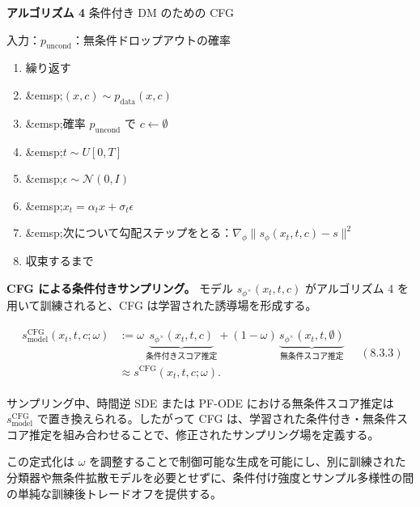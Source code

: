 \textbf{アルゴリズム 4} 条件付き DM のための CFG

入力：$p_{\mathrm{uncond}}$：無条件ドロップアウトの確率

\begin{enumerate}
\item 繰り返す
\item \&emsp;$(x,c)\sim p_{\mathrm{data}}(x,c)$
\item \&emsp;確率 $p_{\mathrm{uncond}}$ で $c\leftarrow\emptyset$
\item \&emsp;$t\sim U[0,T]$
\item \&emsp;$\epsilon\sim\mathcal{N}(0,I)$
\item \&emsp;$x_t=\alpha_t x+\sigma_t\epsilon$
\item \&emsp;次について勾配ステップをとる：$\nabla_\phi\|s_\phi(x_t,t,c)-s\|^2$
\item 収束するまで
\end{enumerate}


\textbf{CFG による条件付きサンプリング。} モデル $s_{\phi^\times}(x_t,t,c)$ がアルゴリズム 4 を用いて訓練されると、CFG は学習された誘導場を形成する。

\begin{align*}
\begin{aligned}
s^{\mathrm{CFG}}_{\mathrm{model}}(x_t,t,c;\omega)
&:=
\omega\,\underbrace{s_{\phi^\times}(x_t,t,c)}_{\text{条件付きスコア推定}}
+
(1-\omega)\,\underbrace{s_{\phi^\times}(x_t,t,\emptyset)}_{\text{無条件スコア推定}}\\
&\approx
s^{\mathrm{CFG}}(x_t,t,c;\omega).
\end{aligned}
\quad (8.3.3)
\end{align*}


サンプリング中、時間逆 SDE または PF-ODE における無条件スコア推定は $s^{\mathrm{CFG}}_{\mathrm{model}}$ で置き換えられる。したがって CFG は、学習された条件付き・無条件スコア推定を組み合わせることで、修正されたサンプリング場を定義する。

この定式化は $\omega$ を調整することで制御可能な生成を可能にし、別に訓練された分類器や無条件拡散モデルを必要とせずに、条件付け強度とサンプル多様性の間の単純な訓練後トレードオフを提供する。

